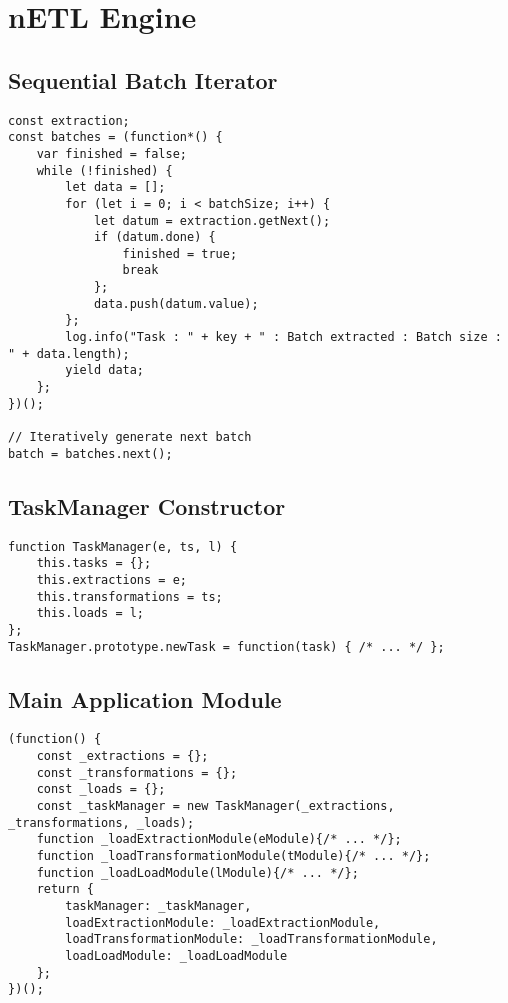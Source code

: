 \section{nETL Engine}
\subsection{Sequential Batch Iterator}
\label{netl-batch-generator}
\begin{verbatim}
const extraction;
const batches = (function*() {
    var finished = false;
    while (!finished) {
        let data = [];
        for (let i = 0; i < batchSize; i++) {
            let datum = extraction.getNext();
            if (datum.done) {
                finished = true;
                break
            };
            data.push(datum.value);
        };
        log.info("Task : " + key + " : Batch extracted : Batch size : " + data.length);
        yield data;
    };
})();

// Iteratively generate next batch
batch = batches.next();
\end{verbatim}

\subsection{TaskManager Constructor}
\label{netl-taskmanager-constructor}
\begin{verbatim}
function TaskManager(e, ts, l) {
    this.tasks = {};
    this.extractions = e;
    this.transformations = ts;
    this.loads = l;
};
TaskManager.prototype.newTask = function(task) { /* ... */ };
\end{verbatim}

\subsection{Main Application Module}
\label{netl-application-module}
\begin{verbatim}
(function() {
    const _extractions = {};
    const _transformations = {};
    const _loads = {};        
    const _taskManager = new TaskManager(_extractions, _transformations, _loads);
    function _loadExtractionModule(eModule){/* ... */};
    function _loadTransformationModule(tModule){/* ... */};
    function _loadLoadModule(lModule){/* ... */};
    return {
        taskManager: _taskManager,
        loadExtractionModule: _loadExtractionModule,
        loadTransformationModule: _loadTransformationModule,
        loadLoadModule: _loadLoadModule
    };
})();
\end{verbatim}


